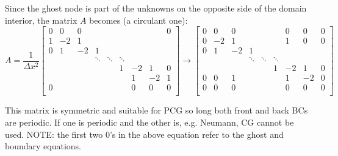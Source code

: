 \documentclass[landscape]{article}
\begin{document}
Since the ghost node is part of the unknowns on the opposite side of the domain interior, the matrix $A$ becomes (a circulant one):
\[ A = \frac{1}{\Delta x^2}
\left[\begin{array}{ccccccccc}
0  & 0     & 0         &           &           &           &           &         &  0 \\
1  & -2    & 1         &           &           &           &           &         &    \\
0  & 1     & -2        & 1         &           &           &           &         &    \\
   &       &           & \ddots    & \ddots    & \ddots    &           &         &    \\
   &       &           &           &           & 1         & -2        & 1       &  0 \\
   &       &           &           &           &           &  1        & -2      &  1 \\
0  &       &           &           &           &           &  0        & 0       &  0 \\
\end{array} \right]
\rightarrow
\left[\begin{array}{ccccccccc}
0  & 0     & 0         &           &           &           &  0        & 0       &  0 \\
0  & -2    & 1         &           &           &           &  1        & 0       &  0 \\
0  & 1     & -2        & 1         &           &           &           &         &    \\
   &       &           & \ddots    & \ddots    & \ddots    &           &         &    \\
   &       &           &           &           & 1         & -2        & 1       &  0 \\
0  & 0     & 1         &           &           &           &  1        & -2      &  0 \\
0  & 0     & 0         &           &           &           &  0        & 0       &  0 \\
\end{array} \right]
\]

This matrix is symmetric and suitable for PCG so long both front and back BCs are periodic. If one is periodic and the other is, e.g. Neumann, CG cannot be used. NOTE: the first two 0's in the above equation refer to the ghost and boundary equations.

\newpage
\end{document}
